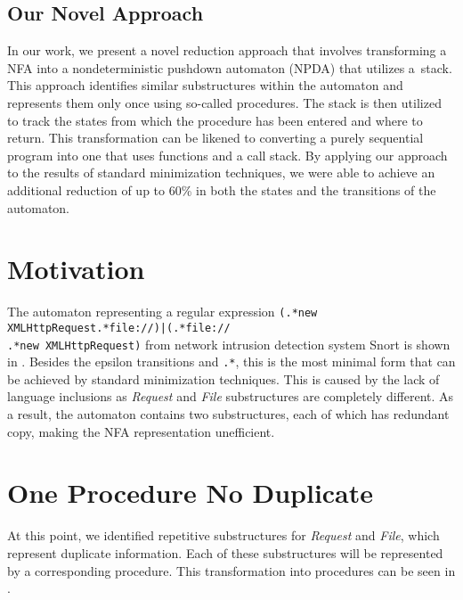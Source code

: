 \documentclass{ExcelAtFIT}
\begin{document}
	\subsection*{Our Novel Approach}
		In our work, we present a novel reduction approach that involves transforming a NFA into a nondeterministic pushdown automaton (NPDA) that utilizes a~stack. This approach identifies similar substructures within the automaton and represents them only once using so-called procedures. The stack is then utilized to track the states from which the procedure has been entered and where to return. This transformation can be likened to converting a purely sequential program into one that uses functions and a call stack. By applying our approach to the results of standard minimization techniques, we were able to achieve an additional reduction of up to 60\% in both the states and the transitions of the automaton.

\section{Motivation}
	The automaton representing a regular expression \texttt{(.*new XMLHttpRequest.*file://)|(.*file://\\.*new XMLHttpRequest)} from network intrusion detection system Snort \cite{Snort} is shown in . Besides the epsilon transitions and \texttt{.*}, this is the most minimal form that can be achieved by standard minimization techniques. This is caused by the lack of language inclusions as  \textit{Request} and \textit{File} substructures are completely different. As a result, the automaton contains two substructures, each of which has redundant copy, making the NFA representation unefficient.

\section{One Procedure No Duplicate}
	At this point, we identified repetitive substructures for \textit{Request} and \textit{File}, which represent duplicate information. Each of these substructures will be represented by a corresponding procedure. This transformation into procedures can be seen in .
\end{document}
